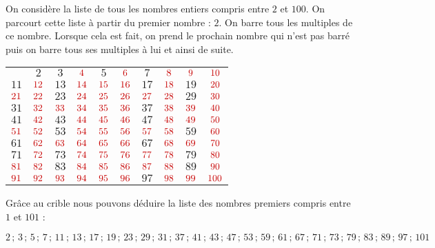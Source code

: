 \documentclass[a4paper,dvipsnames]{article}
\begin{document}
\begin{Mt}
On considère la liste de tous les nombres entiers compris entre $2$ et $100$. On parcourt cette liste à partir du premier nombre : $2$. On barre tous les multiples de ce nombre. Lorsque cela est fait, on prend le prochain nombre qui n'est pas barré puis on barre tous ses multiples à lui et ainsi de suite.

\begin{center}
\begin{tabular}{cccccccccc}
     & $2$ & $3$ & $\textcolor{red}{4}$ & $5$ & $\textcolor{red}{6}$ & $7$ & $\textcolor{red}{8}$ & $\textcolor{red}{9}$ & $\textcolor{red}{10}$ \\
$11$ & $\textcolor{red}{12}$ & $13$ & $\textcolor{red}{14}$ & $\textcolor{red}{15}$ & $\textcolor{red}{16}$ & $17$ & $\textcolor{red}{18}$ & $19$ & $\textcolor{red}{20}$ \\
$\textcolor{red}{21}$ & $\textcolor{red}{22}$ & $23$ & $\textcolor{red}{24}$ & $\textcolor{red}{25}$ & $\textcolor{red}{26}$ & $\textcolor{red}{27}$ & $\textcolor{red}{28}$ & $29$ & $\textcolor{red}{30}$ \\
$31$ & $\textcolor{red}{32}$ & $\textcolor{red}{33}$ & $\textcolor{red}{34}$ & $\textcolor{red}{35}$ & $\textcolor{red}{36}$ & $37$ & $\textcolor{red}{38}$ & $\textcolor{red}{39}$ & $\textcolor{red}{40}$ \\
$41$ & $\textcolor{red}{42}$ & $43$ & $\textcolor{red}{44}$ & $\textcolor{red}{45}$ & $\textcolor{red}{46}$ & $47$ & $\textcolor{red}{48}$ & $\textcolor{red}{49}$ & $\textcolor{red}{50}$ \\
$\textcolor{red}{51}$ & $\textcolor{red}{52}$ & $53$ & $\textcolor{red}{54}$ & $\textcolor{red}{55}$ & $\textcolor{red}{56}$ & $\textcolor{red}{57}$ & $\textcolor{red}{58}$ & $59$ & $\textcolor{red}{60}$ \\
$61$ & $\textcolor{red}{62}$ & $\textcolor{red}{63}$ & $\textcolor{red}{64}$ & $\textcolor{red}{65}$ & $\textcolor{red}{66}$ & $67$ & $\textcolor{red}{68}$ & $\textcolor{red}{69}$ & $\textcolor{red}{70}$ \\
$71$ & $\textcolor{red}{72}$ & $73$ & $\textcolor{red}{74}$ & $\textcolor{red}{75}$ & $\textcolor{red}{76}$ & $\textcolor{red}{77}$ & $\textcolor{red}{78}$ & $79$ & $\textcolor{red}{80}$ \\
$\textcolor{red}{81}$ & $\textcolor{red}{82}$ & $83$ & $\textcolor{red}{84}$ & $\textcolor{red}{85}$ & $\textcolor{red}{86}$ & $\textcolor{red}{87}$ & $\textcolor{red}{88}$ & $89$ & $\textcolor{red}{90}$ \\
$\textcolor{red}{91}$ & $\textcolor{red}{92}$ & $\textcolor{red}{93}$ & $\textcolor{red}{94}$ & $\textcolor{red}{95}$ & $\textcolor{red}{96}$ & $97$ & $\textcolor{red}{98}$ & $\textcolor{red}{99}$ & $\textcolor{red}{100}$
\end{tabular}
\end{center}
Grâce au crible nous pouvons déduire la liste des nombres premiers compris entre $1$ et $101$ :

\[2\,;\, 3\,;\, 5\,;\, 7\,;\, 11\,;\, 13\,;\, 17\,;\, 19\,;\, 23\,;\, 29\,;\, 31\,;\, 37\,;\, 41\,;\, 43\,;\, 47\,;\, 53\,;\, 59\,;\, 61\,;\, 67\,;\, 71\,;\, 73\,;\, 79\,;\, 83\,;\, 89\,;\, 97\,;\, 101\]
\end{Mt}
\end{document}
